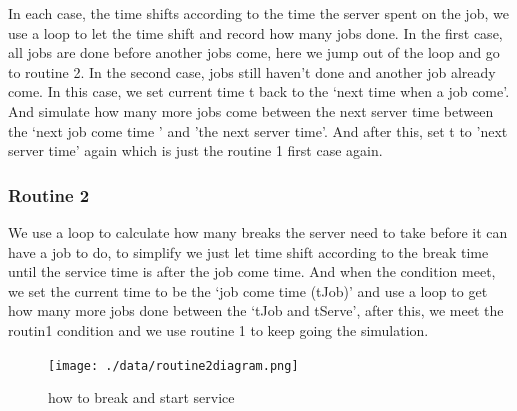 \documentclass[twoside]{article}
\begin{document}
\begin{multicols}{2}
In each case, the time shifts according to the time the server spent on the job, we use a loop to let the time shift and record how many jobs done. In the first case, all jobs are done before another jobs come, here we jump out of the loop and go to routine 2. In the second case, jobs still haven't done and another job already come. In this case, we set current time t back to the `next time when a job come'. And simulate how many more jobs come between the next server time between the `next job come time ' and 'the next server time'. And after this, set t to 'next server time' again which is just the routine 1 first case again. 
\subsubsection{Routine 2}
We use a loop to calculate how many breaks the server need to take before it can have a job to do, to simplify we just let time shift according to the break time until the service time is after the job come time. And when the condition meet, we set the current time to be the `job come time (tJob)' and use a loop to get how many more jobs done between the `tJob and tServe', after this, we meet the routin1 condition and we use routine 1 to keep going the simulation. 
\begin{figure}[H]
   \centering
   \texttt{[image: ./data/routine2diagram.png]}  
   \caption{how to break and start service}
\end{figure}
\end{multicols}
\end{document}
